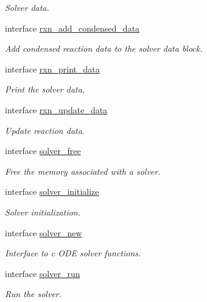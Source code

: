 \begin{DoxyCompactItemize}
\begin{DoxyCompactList}\small\item\em Solver data. \end{DoxyCompactList}\item 
interface \mbox{\hyperlink{interfacepmc__phlex__solver__data_1_1rxn__add__condensed__data}{rxn\+\_\+add\+\_\+condensed\+\_\+data}}
\begin{DoxyCompactList}\small\item\em Add condensed reaction data to the solver data block. \end{DoxyCompactList}\item 
interface \mbox{\hyperlink{interfacepmc__phlex__solver__data_1_1rxn__print__data}{rxn\+\_\+print\+\_\+data}}
\begin{DoxyCompactList}\small\item\em Print the solver data. \end{DoxyCompactList}\item 
interface \mbox{\hyperlink{interfacepmc__phlex__solver__data_1_1rxn__update__data}{rxn\+\_\+update\+\_\+data}}
\begin{DoxyCompactList}\small\item\em Update reaction data. \end{DoxyCompactList}\item 
interface \mbox{\hyperlink{interfacepmc__phlex__solver__data_1_1solver__free}{solver\+\_\+free}}
\begin{DoxyCompactList}\small\item\em Free the memory associated with a solver. \end{DoxyCompactList}\item 
interface \mbox{\hyperlink{interfacepmc__phlex__solver__data_1_1solver__initialize}{solver\+\_\+initialize}}
\begin{DoxyCompactList}\small\item\em Solver initialization. \end{DoxyCompactList}\item 
interface \mbox{\hyperlink{interfacepmc__phlex__solver__data_1_1solver__new}{solver\+\_\+new}}
\begin{DoxyCompactList}\small\item\em Interface to c O\+DE solver functions. \end{DoxyCompactList}\item 
interface \mbox{\hyperlink{interfacepmc__phlex__solver__data_1_1solver__run}{solver\+\_\+run}}
\begin{DoxyCompactList}\small\item\em Run the solver. \end{DoxyCompactList}\item 

\end{DoxyCompactItemize}
